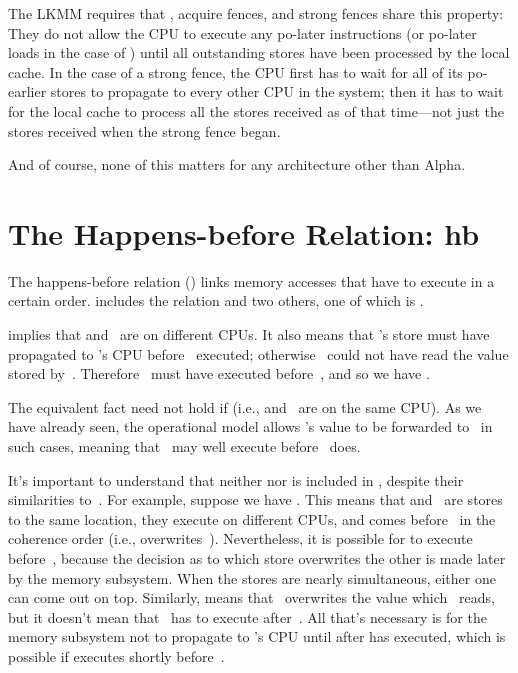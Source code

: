 The LKMM requires that , acquire fences, and strong fences
share this property:
They do not allow the CPU to execute any po-later instructions (or
po-later loads in the case of ) until all outstanding
stores have been processed by the local cache.
In the case of a strong fence, the CPU first has to wait for all of its
po-earlier stores to propagate to every other CPU in the system; then
it has to wait for the local cache to process all the stores received
as of that time---not just the stores received when the strong fence
began.

And of course, none of this matters for any architecture other than
Alpha.


\section{The Happens-before Relation: hb}
\label{sec:docs:explanation:The Happens-before Relation: hb}

The happens-before relation () links memory accesses that have to
execute in a certain order.
 includes the  relation and two others, one of which is .

 implies that  and~ are on different CPUs.
It also means that 's store must have propagated to 's
CPU before ~executed; otherwise ~could not have read the
value stored by~.
Therefore ~must have executed before~, and so we have
.

The equivalent fact need not hold if 
(i.e.,  and~ are on the same CPU\@).
As we have already seen, the operational model allows 's value
to be forwarded to~ in such cases, meaning that ~may well
execute before ~does.

It's important to understand that neither  nor  is included in
, despite their similarities to~.
For example, suppose we have .
This means that  and~ are stores to the same location,
they execute on different CPUs, and  comes before~ in the coherence
order (i.e.,  overwrites~).
Nevertheless, it is possible for  to execute before~,
because the decision as to which store overwrites the other is made
later by the memory subsystem.
When the stores are nearly simultaneous, either one can come out on top.
Similarly,  means that ~overwrites the value
which ~reads, but it doesn't mean that ~has to execute
after~.
All that's necessary is for the memory subsystem not to propagate 
to 's CPU until after  has executed, which is possible if
 executes shortly before~.

